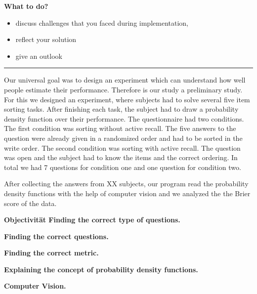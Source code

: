 \documentclass[../main/main.tex]{subfiles}
\begin{document}
	\textbf{What to do?}
	\begin{itemize}
		\item discuss challenges that you faced during implementation, 
		\item reflect your solution
		\item give an outlook
	\end{itemize}

	\noindent\rule{\textwidth}{.4pt}
	
	\vspace{2mm}
	
	\noindent Our universal goal was to design an experiment which can understand how well people estimate their performance. Therefore is our study a preliminary study. For this we designed an experiment, where subjects had to solve several five item sorting tasks. After finishing each task, the subject had to draw a probability density function over their performance. The questionnaire had two conditions. The first condition was sorting without active recall. The five answers to the question were already given in a randomized order and had to be sorted in the write order. The second condition was sorting with active recall. The question was open and the subject had to know the items and the correct ordering. In total we had 7 questions for condition one and one question for condition two.
	
	After collecting the answers from XX subjects, our program read the probability density functions with the help of computer vision and we analyzed the the Brier score of the data.
	
	\textbf{Objectivität Finding the correct type of questions.}
	
	\textbf{Finding the correct questions.}
	
	\textbf{Finding the correct metric.}
	
	\textbf{Explaining the concept of probability density functions.}
	
	\textbf{Computer Vision.}
	
\end{document}
